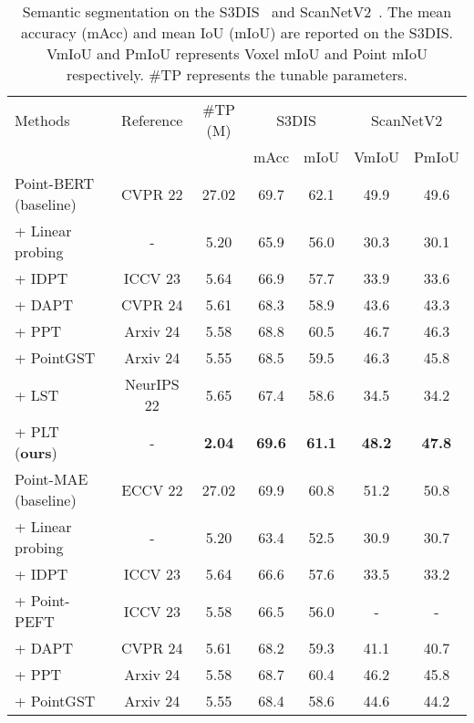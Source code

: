 \begin{table}
  \centering
  \scriptsize
  \setlength{\tabcolsep}{1.2mm}
  \caption{Semantic segmentation on the S3DIS~\cite{armeni20163d} and ScanNetV2~\cite{dai2017scannet}. The
    mean accuracy (mAcc) and mean IoU (mIoU) are reported on the S3DIS. VmIoU and PmIoU represents Voxel mIoU and Point mIoU respectively.
    \#TP represents the tunable parameters.}
    \begin{tabular}{lcccccc}
    \toprule
    Methods & Reference & \#TP (M)& \multicolumn{2}{c}{S3DIS} & \multicolumn{2}{c}{ScanNetV2} \\
    & & & mAcc & mIoU & VmIoU & PmIoU \\
    \midrule
    Point-BERT~\cite{yu2022point} (baseline) &  CVPR 22 & 27.02 & 69.7 & 62.1 & 49.9 & 49.6 \\ 
    + Linear probing & - & 5.20  & 65.9  & 56.0 & 30.3 & 30.1  \\
    + IDPT~\cite{zha2023instance} & ICCV 23 & 5.64  & 66.9  & 57.7 & 33.9 & 33.6  \\
    + DAPT~\cite{zhou2024dynamic} & CVPR 24 & 5.61  & 68.3 & 58.9 & 43.6 & 43.3 \\
    + PPT~\cite{zhang2024positional} & Arxiv 24 & 5.58 & 68.8 & 60.5 & 46.7 & 46.3 \\
    + PointGST~\cite{liang2024parameter} & Arxiv 24 & 5.55  & 68.5 & 59.5 & 46.3 & 45.8  \\
    + LST~\cite{sung2022lst} & NeurIPS 22 & 5.65 & 67.4 & 58.6 & 34.5 & 34.2  \\
    \rowcolor{linecolor!40}+ PLT (\textbf{ours})& - & \textbf{2.04}  & \textbf{69.6} & \textbf{61.1} & \textbf{48.2} & \textbf{47.8}  \\
    \midrule
    Point-MAE~\cite{pang2022masked} (baseline) &  ECCV 22 & 27.02 & 69.9 & 60.8 & 51.2 & 50.8 \\ 
    + Linear probing & - & 5.20  & 63.4  & 52.5 & 30.9 & 30.7 \\
    + IDPT~\cite{zha2023instance} & ICCV 23 & 5.64  & 66.6  & 57.6 & 33.5 & 33.2  \\
    + Point-PEFT~\cite{tang2024point} & ICCV 23 & 5.58  & 66.5  & 56.0 & - & -  \\
    + DAPT~\cite{zhou2024dynamic} & CVPR 24 & 5.61  & 68.2 & 59.3 & 41.1 & 40.7 \\
    + PPT~\cite{zhang2024positional} & Arxiv 24 & 5.58 & 68.7 & 60.4 & 46.2 & 45.8\\
    + PointGST~\cite{liang2024parameter} & Arxiv 24 & 5.55  & 68.4 & 58.6 & 44.6 & 44.2\\

\end{tabular}
\end{table}
